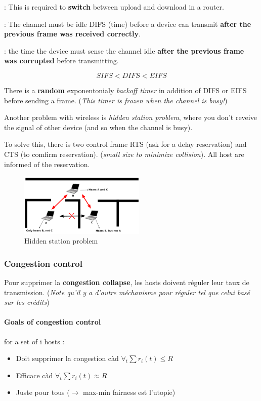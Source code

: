 \begin{itemize}
\begin{description}
    \item[SIFS] : This is required to \textbf{switch} between upload and download in a router.
    \item[DIFS] : The channel must be idle DIFS (time) before a device can transmit \textbf{after the previous frame was received correctly}.
    \item[EIFS] : the time the device must sense the channel idle \textbf{after the previous frame was corrupted} before transmitting.
    \item $$SIFS < DIFS < EIFS$$
\end{description}

There is a \textbf{random} exponentonialy \textit{backoff timer} in addition of \textsc{DIFS} or \textsc{EIFS}
before sending a frame. (\textit{This timer is frozen when the channel is busy!})

Another problem with wireless is \textit{hidden station problem}, where you don't reveive 
the signal of other device (and so when the channel is busy).

To solve this, there is two control frame \textsc{RTS} (ask for a delay reservation)
and \textsc{CTS} (to comfirm reservation). (\textit{small size to minimize collision}).
All host are informed of the reservation.

\begin{figure}[h]
    \centering
    \includegraphics[width=6cm]{hiddenstation.png}
    \caption{Hidden station problem}
\end{figure}

\end{itemize}


\subsubsection{Congestion control}
\label{congestion}

Pour supprimer la \textbf{congestion collapse}, les hosts doivent réguler leur taux
de transmission. (\textit{Note qu'il y a d'autre méchanisme pour réguler tel que celui
basé sur les crédits})

\paragraph{Goals of congestion control} for a set of i hosts :
\begin{itemize}
    \item Doit supprimer la congestion càd $\forall_t \sum r_i(t) \leq R$
    \item Efficace càd $\forall_t \sum r_i(t) \approx R$
    \item Juste pour tous ($\to$ max-min fairness est l'utopie)
\end{itemize}

